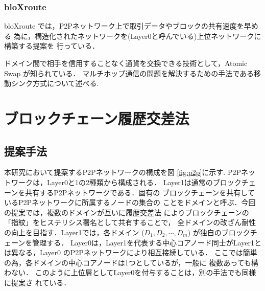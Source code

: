 \documentclass[a4paper,12pt]{jsarticle}
\begin{document}
\subsubsection{bloXroute}
bloXroute \cite{bloX} では，P2Pネットワーク上で取引データやブロックの共有速度を早める
為に，構造化されたネットワークを(Layer0と呼んでいる)上位ネットワークに構築する提案を
行っている．

ドメイン間で相手を信用することなく通貨を交換できる技術として，Atomic Swap \cite{atomicswap}
が知られている．
マルチホップ通信の問題を解決するための手法である移動シンク方式について述べる.

\newpage
\section{ブロックチェーン履歴交差法}
\subsection{提案手法}
\label{teian}

本研究において提案するP2Pネットワークの構成を図 \ref{fig:p2p}に示す. 
%
%
P2Pネットワークは，Layer0と1の2種類から構成される．
Layer1は通常のブロックチェーンを共有するP2Pネットワークである．固有の
ブロックチェーンを共有しているP2Pネットワークに所属するノードの集合の
ことをドメインと呼ぶ．今回の提案では，複数のドメインが互いに履歴交差法
によりブロックチェーンの「指紋」をヒステリシス署名として共有することで，
全ドメインの改ざん耐性の向上を目指す．Layer1では，各ドメイン 
($D_1, D_2, \cdots, D_m$) が独自のブロックチェーンを管理する．
Layer0は，Layer1を代表する中心コアノード同士がLayer1とは異なる，Layer0
のP2Pネットワークにより相互接続している．
ここでは簡単の為，各ドメインの中心コアノードは1つとしているが，一般に
複数あっても構わない．
このように上位層としてLayer0を付与することは，別の手法でも同様に提案さ
れている\cite{bloX}．
\end{document}
